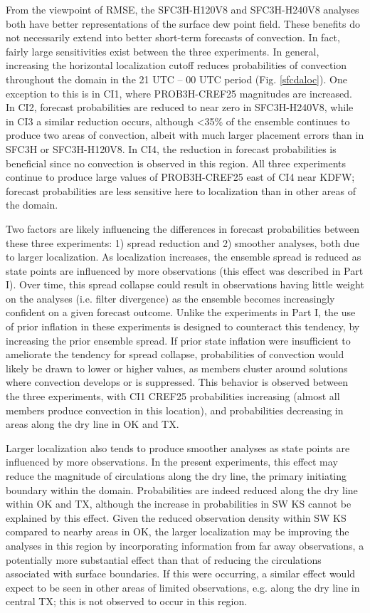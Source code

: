 From the viewpoint of RMSE, the SFC3H-H120V8 and SFC3H-H240V8 analyses both have better representations of the surface dew point field. These benefits do not necessarily extend into better short-term forecasts of convection. In fact, fairly large sensitivities exist between the three experiments. In general, increasing the horizontal localization cutoff reduces probabilities of convection throughout the domain in the 21 UTC – 00 UTC period (Fig. \ref{sfcdaloc}). One exception to this is in CI1, where PROB3H-CREF25 magnitudes are increased. In CI2, forecast probabilities are reduced to near zero in SFC3H-H240V8, while in CI3 a similar reduction occurs, although \textless 35\% of the ensemble continues to produce two areas of convection, albeit with much larger placement errors than in SFC3H or SFC3H-H120V8. In CI4, the reduction in forecast probabilities is beneficial since no convection is observed in this region. All three experiments continue to produce large values of PROB3H-CREF25 east of CI4 near KDFW; forecast probabilities are less sensitive here to localization than in other areas of the domain.

Two factors are likely influencing the differences in forecast probabilities between these three experiments: 1) spread reduction and 2) smoother analyses, both due to larger localization. As localization increases, the ensemble spread is reduced as state points are influenced by more observations (this effect was described in Part I). Over time, this spread collapse could result in observations having little weight on the analyses (i.e. filter divergence) as the ensemble becomes increasingly confident on a given forecast outcome. Unlike the experiments in Part I, the use of prior inflation in these experiments is designed to counteract this tendency, by increasing the prior ensemble spread. If prior state inflation were insufficient to ameliorate the tendency for spread collapse, probabilities of convection would likely be drawn to lower or higher values, as members cluster around solutions where convection develops or is suppressed. This behavior is observed between the three experiments, with CI1 CREF25 probabilities increasing (almost all members produce convection in this location), and probabilities decreasing in areas along the dry line in OK and TX.

Larger localization also tends to produce smoother analyses as state points are influenced by more observations. In the present experiments, this effect may reduce the magnitude of circulations along the dry line, the primary initiating boundary within the domain. Probabilities are indeed reduced along the dry line within OK and TX, although the increase in probabilities in SW KS cannot be explained by this effect. Given the reduced observation density within SW KS compared to nearby areas in OK, the larger localization may be improving the analyses in this region by incorporating information from far away observations, a potentially more substantial effect than that of reducing the circulations associated with surface boundaries. If this were occurring, a similar effect would expect to be seen in other areas of limited observations, e.g. along the dry line in central TX; this is not observed to occur in this region.

